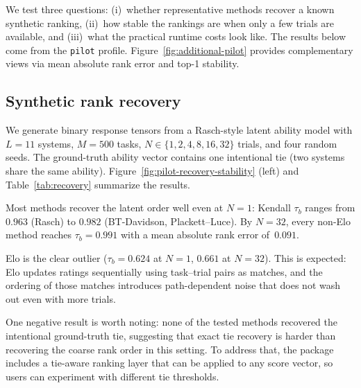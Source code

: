 \documentclass{juliacon}
\begin{document}
We test three questions: (i)~whether representative methods recover a known synthetic ranking, (ii)~how stable the rankings are when only a few trials are available, and (iii)~what the practical runtime costs look like. The results below come from the \texttt{pilot} profile. Figure~\ref{fig:additional-pilot} provides complementary views via mean absolute rank error and top-1 stability.

\subsection{Synthetic rank recovery}

We generate binary response tensors from a Rasch-style latent ability model with \(L=11\) systems, \(M=500\) tasks, \(N \in \{1,2,4,8,16,32\}\) trials, and four random seeds. The ground-truth ability vector contains one intentional tie (two systems share the same ability). Figure~\ref{fig:pilot-recovery-stability} (left) and Table~\ref{tab:recovery} summarize the results.

Most methods recover the latent order well even at \(N=1\): Kendall \(\tau_b\) ranges from \(0.963\) (Rasch) to \(0.982\) (BT-Davidson, Plackett--Luce). By \(N=32\), every non-Elo method reaches \(\tau_b=0.991\) with a mean absolute rank error of~\(0.091\).

Elo is the clear outlier (\(\tau_b = 0.624\) at \(N=1\), \(0.661\) at \(N=32\)). This is expected: Elo updates ratings sequentially using task--trial pairs as matches, and the ordering of those matches introduces path-dependent noise that does not wash out even with more trials.

One negative result is worth noting: none of the tested methods recovered the intentional ground-truth tie, suggesting that exact tie recovery is harder than recovering the coarse rank order in this setting. To address that, the package includes a tie-aware ranking layer that can be applied to any score vector, so users can experiment with different tie thresholds.
\end{document}
